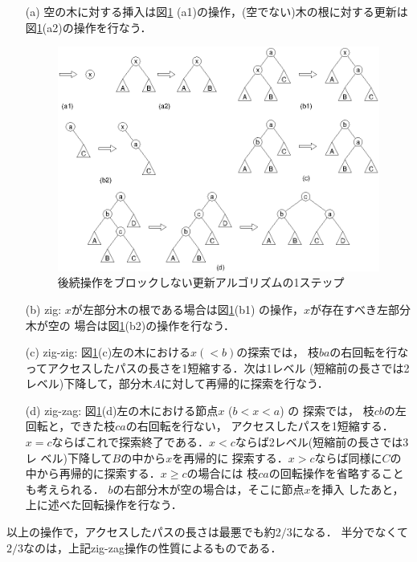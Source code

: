 \documentclass[T]{compsoft}
\begin{document}
\begin{itemize}
\item[(a)]
空の木に対する挿入は図\ref{figure:update}
(a1)の操作，(空でない)木の根に対する更新は
図\ref{figure:update}(a2)の操作を行なう．

\begin{figure}[t]
  \centerline {\includegraphics {images/fig3.eps}}
\caption{後続操作をブロックしない更新アルゴリズムの1ステップ}
\label{figure:update}
\end{figure}

\item[(b)]
zig:
$x$が左部分木の根である場合は図\ref{figure:update}(b1)
の操作，$x$が存在すべき左部分木が空の
場合は図\ref{figure:update}(b2)の操作を行なう．

\item[(c)]
zig-zig: 図\ref{figure:update}(c)左の木における$x (<b)$の探索では，
枝$ba$の右回転を行なってアクセスしたパスの長さを1短縮する．次は1レベル
(短縮前の長さでは2レベル)下降して，部分木$A$に対して再帰的に探索を行なう．

\item[(d)]
zig-zag: 図\ref{figure:update}(d)左の木における節点$x$ ($b<x<a$) の
探索では，
枝$cb$の左回転と，できた枝$ca$の右回転を行ない，
アクセスしたパスを1短縮する．
%
%
$x=c$ならばこれで探索終了である．$x<c$ならば2レベル(短縮前の長さでは3レ
ベル)下降して$B$の中から$x$を再帰的に
探索する．$x>c$ならば同様に$C$の中から再帰的に探索する．$x\ge c$の場合には
枝$ca$の回転操作を省略することも考えられる．
%
$b$の右部分木が空の場合は，そこに節点$x$を挿入
したあと，上に述べた回転操作を行なう．

\end{itemize}
以上の操作で，アクセスしたパスの長さは最悪でも約$2/3$になる．
%
半分でなくて$2/3$なのは，上記zig-zag操作の性質によるものである．
\end{document}
